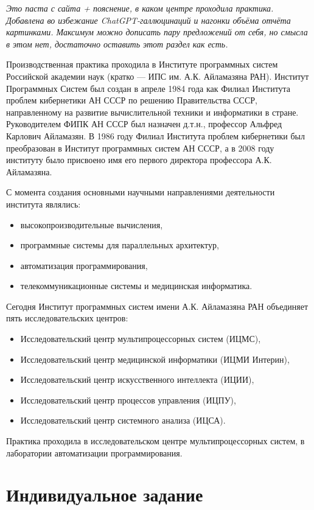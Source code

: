 \documentclass[14pt, russian]{scrartcl}
\begin{document}
\textit{Это паста с сайта + пояснение, в каком центре проходила практика. Добавлена во избежание ChatGPT-галлюцинаций и нагонки объёма отчёта картинками. Максимум можно дописать пару предложений от себя, но смысла в этом нет, достаточно оставить этот раздел как есть.}

\bigskip

Производственная практика проходила в Институте программных систем
Российской академии наук (кратко --- ИПС им. А.К. Айламазяна РАН). Институт Программных Систем был создан в апреле 1984 года как Филиал Института проблем кибернетики АН СССР по решению Правительства СССР, направленному на развитие вычислительной техники и информатики в стране. Руководителем ФИПК АН СССР был назначен д.т.н., профессор Альфред Карлович Айламазян. В 1986 году Филиал Института проблем кибернетики был преобразован в Институт программных систем АН СССР, а в 2008 году институту было присвоено имя его первого директора профессора А.К. Айламазяна. 

С момента создания основными научными направлениями
деятельности института являлись:
\begin{itemize}
\item высокопроизводительные вычисления,
\item программные системы для параллельных архитектур,
\item автоматизация программирования,
\item телекоммуникационные системы и медицинская информатика.
\end{itemize}

Сегодня Институт программных систем имени А.К. Айламазяна РАН объединяет пять исследовательских центров:
\begin{itemize}
\item Исследовательский центр мультипроцессорных систем (ИЦМС),
\item Исследовательский центр медицинской информатики (ИЦМИ Интерин),
\item Исследовательский центр искусственного интеллекта (ИЦИИ),
\item Исследовательский центр процессов управления (ИЦПУ),
\item Исследовательский центр системного анализа (ИЦСА).
\end{itemize}

Практика проходила в исследовательском центре мультипроцессорных систем, в лаборатории автоматизации программирования.

\newpage
\section{Индивидуальное задание}
\end{document}
